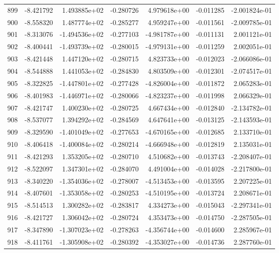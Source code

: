 \begin{tabular}{rrrrrrr}
 899 &  -8.421792 &  1.493885e+02 & -0.280726 &  4.979618e+00 &   -0.011285 & -2.001824e-01 \\
 900 &  -8.558320 &  1.487774e+02 & -0.285277 &  4.959247e+00 &   -0.011561 & -2.009785e-01 \\
 901 &  -8.313076 & -1.494536e+02 & -0.277103 & -4.981787e+00 &   -0.011131 &  2.001121e-01 \\
 902 &  -8.400441 & -1.493739e+02 & -0.280015 & -4.979131e+00 &   -0.011259 &  2.002051e-01 \\
 903 &  -8.421448 &  1.447120e+02 & -0.280715 &  4.823733e+00 &   -0.012023 & -2.066086e-01 \\
 904 &  -8.544888 &  1.441053e+02 & -0.284830 &  4.803509e+00 &   -0.012301 & -2.074517e-01 \\
 905 &  -8.322825 & -1.447801e+02 & -0.277428 & -4.826004e+00 &   -0.011872 &  2.065283e-01 \\
 906 &  -8.401983 & -1.446971e+02 & -0.280066 & -4.823237e+00 &   -0.011998 &  2.066329e-01 \\
 907 &  -8.421747 &  1.400230e+02 & -0.280725 &  4.667434e+00 &   -0.012840 & -2.134782e-01 \\
 908 &  -8.537077 &  1.394292e+02 & -0.284569 &  4.647641e+00 &   -0.013125 & -2.143593e-01 \\
 909 &  -8.329590 & -1.401049e+02 & -0.277653 & -4.670165e+00 &   -0.012685 &  2.133710e-01 \\
 910 &  -8.406418 & -1.400084e+02 & -0.280214 & -4.666948e+00 &   -0.012819 &  2.135031e-01 \\
 911 &  -8.421293 &  1.353205e+02 & -0.280710 &  4.510682e+00 &   -0.013743 & -2.208407e-01 \\
 912 &  -8.522097 &  1.347301e+02 & -0.284070 &  4.491004e+00 &   -0.014028 & -2.217800e-01 \\
 913 &  -8.340220 & -1.354036e+02 & -0.278007 & -4.513453e+00 &   -0.013595 &  2.207225e-01 \\
 914 &  -8.407601 & -1.353058e+02 & -0.280253 & -4.510195e+00 &   -0.013724 &  2.208671e-01 \\
 915 &  -8.514513 &  1.300282e+02 & -0.283817 &  4.334273e+00 &   -0.015043 & -2.297341e-01 \\
 916 &  -8.421727 &  1.306042e+02 & -0.280724 &  4.353473e+00 &   -0.014750 & -2.287505e-01 \\
 917 &  -8.347890 & -1.307023e+02 & -0.278263 & -4.356744e+00 &   -0.014600 &  2.285967e-01 \\
 918 &  -8.411761 & -1.305908e+02 & -0.280392 & -4.353027e+00 &   -0.014736 &  2.287760e-01 \\

\end{tabular}

